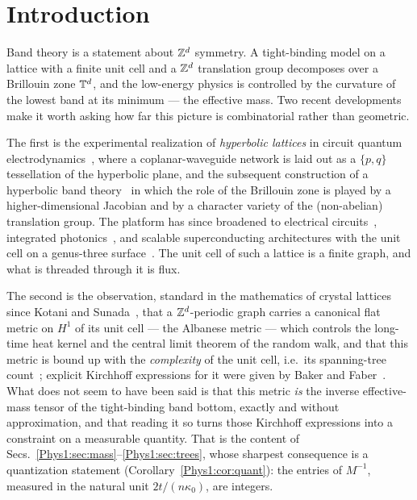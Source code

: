 \section{Introduction}\label{Phys1:sec:intro}

Band theory is a statement about $\mathbb{Z}^{d}$ symmetry. A tight-binding model on a lattice with
a finite unit cell and a $\mathbb{Z}^{d}$ translation group decomposes over a Brillouin zone
$\mathbb{T}^{d}$, and the low-energy physics is controlled by the curvature of the lowest band at
its minimum --- the effective mass. Two recent developments make it worth asking how far
this picture is combinatorial rather than geometric.

The first is the experimental realization of \emph{hyperbolic lattices} in circuit quantum
electrodynamics~\cite{KFH}, where a coplanar-waveguide network is laid out as a $\{p,q\}$
tessellation of the hyperbolic plane, and the subsequent construction of a hyperbolic band
theory~\cite{MR1,MR2} in which the role of the Brillouin zone is played by a
higher-dimensional Jacobian and by a character variety of the (non-abelian) translation
group. The platform has since broadened to electrical
circuits~\cite{Leng22}, integrated photonics~\cite{Huang24}, and scalable superconducting
architectures with the unit cell on a genus-three surface~\cite{Xu25}. The unit cell of such
a lattice is a finite graph, and what is threaded through it is flux.

The second is the observation, standard in the mathematics of crystal lattices since Kotani
and Sunada~\cite{KS1,KS2}, that a $\mathbb{Z}^{d}$-periodic graph carries a canonical flat metric
on $H^{1}$ of its unit cell --- the Albanese metric --- which controls the long-time heat
kernel and the central limit theorem of the random walk, and that this metric is bound up
with the \emph{complexity} of the unit cell, i.e.\ its spanning-tree count~\cite{KS3};
explicit Kirchhoff expressions for it were given by Baker and Faber~\cite{BF}. What does not
seem to have been said is that this metric \emph{is} the inverse effective-mass tensor of
the tight-binding band bottom, exactly and without approximation, and that reading it so
turns those Kirchhoff expressions into a constraint on a measurable quantity. That is the
content of Secs.~\ref{Phys1:sec:mass}--\ref{Phys1:sec:trees}, whose sharpest consequence is a
quantization statement (Corollary~\ref{Phys1:cor:quant}): the entries of $M^{-1}$, measured in the
natural unit $2t/(n\kappa_0)$, are integers.

